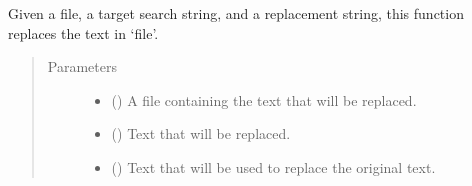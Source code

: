 \documentclass[letterpaper,12pt,english,openany,oneside]{sphinxmanual}
\begin{document}
\begin{fulllineitems}
\label{\detokenize{simulation:simulation.replace}}
Given a file, a target search string, and a replacement string, this function replaces the text in ‘file’.
\begin{quote}\begin{description}
\item[{Parameters}] \leavevmode\begin{itemize}
\item {} 
 () \textendash{} A file containing the text that will be replaced.

\item {} 
 () \textendash{} Text that will be replaced.

\item {} 
 () \textendash{} Text that will be used to replace the original text.

\end{itemize}

\end{description}\end{quote}

\end{fulllineitems}


\begin{fulllineitems}
\label{\detokenize{simulation:simulation.simulate}}
\end{fulllineitems}

\end{document}
